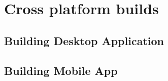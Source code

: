 \chapter{{Cross platform builds}}%
\label{ch:deploy}

\section{{Building Desktop Application}}%
\label{sec:desktop}

\section{{Building Mobile App}}%
\label{sec:mobile}
